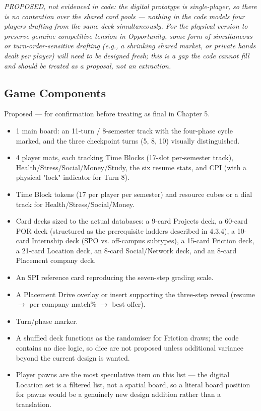 \emph{PROPOSED, not evidenced in code: the digital prototype is single-player, so there is no contention over the shared card pools --- nothing in the code models four players drafting from the same deck simultaneously. For the physical version to preserve genuine competitive tension in Opportunity, some form of simultaneous or turn-order-sensitive drafting (e.g., a shrinking shared market, or private hands dealt per player) will need to be designed fresh; this is a gap the code cannot fill and should be treated as a proposal, not an extraction.}

\subsection{Game Components}

Proposed --- for confirmation before treating as final in Chapter 5.

\begin{itemize}\item 1 main board: an 11-turn / 8-semester track with the four-phase cycle marked, and the three checkpoint turns (5, 8, 10) visually distinguished.\item 4 player mats, each tracking Time Blocks (17-slot per-semester track), Health/Stress/Social/Money/Study, the six resume stats, and CPI (with a physical "lock" indicator for Turn 8).\item Time Block tokens (17 per player per semester) and resource cubes or a dial track for Health/Stress/Social/Money.\item Card decks sized to the actual databases: a 9-card Projects deck, a 60-card POR deck (structured as the prerequisite ladders described in 4.3.4), a 10-card Internship deck (SPO vs. off-campus subtypes), a 15-card Friction deck, a 21-card Location deck, an 8-card Social/Network deck, and an 8-card Placement company deck.\item An SPI reference card reproducing the seven-step grading scale.\item A Placement Drive overlay or insert supporting the three-step reveal (resume $\rightarrow$ per-company match\% $\rightarrow$ best offer).\item Turn/phase marker.\item A shuffled deck functions as the randomiser for Friction draws; the code contains no dice logic, so dice are not proposed unless additional variance beyond the current design is wanted.\item Player pawns are the most speculative item on this list --- the digital Location set is a filtered list, not a spatial board, so a literal board position for pawns would be a genuinely new design addition rather than a translation.\end{itemize}

